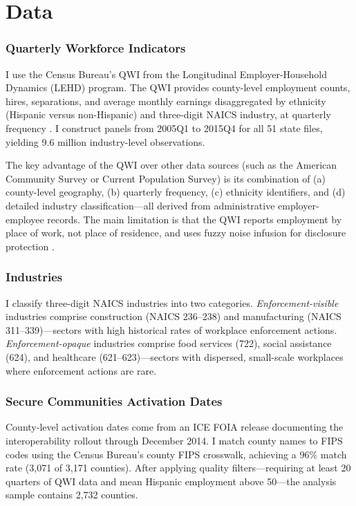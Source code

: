 \documentclass[12pt]{article}
\begin{document}
\section{Data}
\label{sec:data}

\subsubsection*{Quarterly Workforce Indicators} I use the Census Bureau's QWI from the Longitudinal Employer-Household Dynamics (LEHD) program. The QWI provides county-level employment counts, hires, separations, and average monthly earnings disaggregated by ethnicity (Hispanic versus non-Hispanic) and three-digit NAICS industry, at quarterly frequency \citep{abowd2009lehd}. I construct panels from 2005Q1 to 2015Q4 for all 51 state files, yielding 9.6 million industry-level observations.

The key advantage of the QWI over other data sources (such as the American Community Survey or Current Population Survey) is its combination of (a) county-level geography, (b) quarterly frequency, (c) ethnicity identifiers, and (d) detailed industry classification---all derived from administrative employer-employee records. The main limitation is that the QWI reports employment by place of work, not place of residence, and uses fuzzy noise infusion for disclosure protection \citep{abowd2009lehd}.

\subsubsection*{Industries} I classify three-digit NAICS industries into two categories. \textit{Enforcement-visible} industries comprise construction (NAICS 236--238) and manufacturing (NAICS 311--339)---sectors with high historical rates of workplace enforcement actions. \textit{Enforcement-opaque} industries comprise food services (722), social assistance (624), and healthcare (621--623)---sectors with dispersed, small-scale workplaces where enforcement actions are rare.

\subsubsection*{Secure Communities Activation Dates} County-level activation dates come from an ICE FOIA release documenting the interoperability rollout through December 2014. I match county names to FIPS codes using the Census Bureau's county FIPS crosswalk, achieving a 96\% match rate (3,071 of 3,171 counties). After applying quality filters---requiring at least 20 quarters of QWI data and mean Hispanic employment above 50---the analysis sample contains 2,732 counties.
\end{document}
